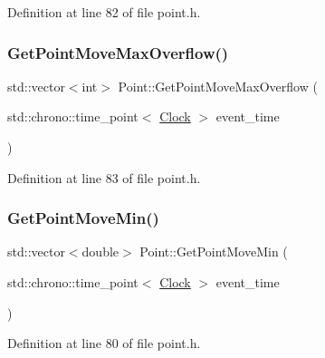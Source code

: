 Definition at line 82 of file point.\+h.

\mbox{\label{class_point_a83e3715d429ab2099f0c421d46603004}} 
\subsubsection{\texorpdfstring{Get\+Point\+Move\+Max\+Overflow()}{GetPointMoveMaxOverflow()}}
{\footnotesize\ttfamily std\+::vector$<$int$>$ Point\+::\+Get\+Point\+Move\+Max\+Overflow (\begin{DoxyParamCaption}\item[{std\+::chrono\+::time\+\_\+point$<$ \mbox{\hyperlink{universe_8h_a0ef8d951d1ca5ab3cfaf7ab4c7a6fd80}{Clock}} $>$}]{event\+\_\+time }\end{DoxyParamCaption})\hspace{0.3cm}{\ttfamily [inline]}}



Definition at line 83 of file point.\+h.

\mbox{\label{class_point_a92d41c8cd9a07ef56223839a44f54fe8}} 
\subsubsection{\texorpdfstring{Get\+Point\+Move\+Min()}{GetPointMoveMin()}}
{\footnotesize\ttfamily std\+::vector$<$double$>$ Point\+::\+Get\+Point\+Move\+Min (\begin{DoxyParamCaption}\item[{std\+::chrono\+::time\+\_\+point$<$ \mbox{\hyperlink{universe_8h_a0ef8d951d1ca5ab3cfaf7ab4c7a6fd80}{Clock}} $>$}]{event\+\_\+time }\end{DoxyParamCaption})\hspace{0.3cm}{\ttfamily [inline]}}



Definition at line 80 of file point.\+h.

\mbox{\label{class_point_a3c88bb9f80535e98fb0f479b69f75c64}} 
